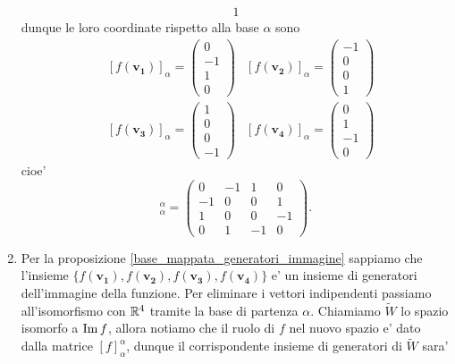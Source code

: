 \begin{solution}
\begin{enumerate}
\begin{alignat*}{1}
        \end{alignat*}
        dunque le loro coordinate rispetto alla base $\alpha$ sono
        \begin{align*}
            &[f(\bm{v_1})]_{\alpha} = \begin{pmatrix}
                0 \\ -1 \\ 1 \\ 0
            \end{pmatrix} &[f(\bm{v_2})]_{\alpha} = \begin{pmatrix}
                -1 \\ 0 \\ 0 \\ 1
            \end{pmatrix}
            \\&[f(\bm{v_3})]_{\alpha} = \begin{pmatrix}
                1 \\ 0 \\ 0 \\ -1
            \end{pmatrix} &[f(\bm{v_4})]_{\alpha} = \begin{pmatrix}
                0 \\ 1 \\ -1 \\ 0
            \end{pmatrix}
        \end{align*}
        cioe' \begin{equation*}
            [f]^{\alpha}_{\alpha} = \begin{pmatrix}
                0 & -1 & 1 & 0 \\ -1 & 0 & 0 & 1 \\
                1 & 0 & 0 & -1 \\ 0 & 1 & -1 & 0
            \end{pmatrix}.
        \end{equation*}
        \item Per la proposizione \ref{base_mappata_generatori_immagine} sappiamo che l'insieme
        $\{f(\bm{v_1}), f(\bm{v_2}), f(\bm{v_3}), f(\bm{v_4})\}$ e' un insieme di generatori dell'immagine della funzione. 
        Per eliminare i vettori indipendenti passiamo all'isomorfismo con $\mathbb{R}^4$ tramite la base di partenza $\alpha$. Chiamiamo $\widetilde{W}$ lo spazio isomorfo a $\operatorname{Im}f$, allora notiamo che il ruolo di $f$ nel nuovo spazio e' dato dalla matrice $[f]^{\alpha}_{\alpha}$, dunque il corrispondente insieme di generatori di $\widetilde{W}$ sara' \begin{gather*}

\end{gather*}
\end{enumerate}
\end{solution}
